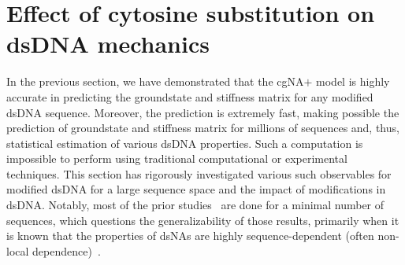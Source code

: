 \section{Effect of cytosine substitution on dsDNA mechanics}\label{c6:comparison_sec}
In the previous section, we have demonstrated that the cgNA$+$ model is highly accurate in predicting the groundstate and stiffness matrix for any modified dsDNA sequence.
Moreover, the prediction is extremely fast, making possible the prediction of groundstate and stiffness matrix for millions of sequences and, thus, statistical estimation of various dsDNA properties.
Such a computation is impossible to perform using traditional computational or experimental techniques. 
This section has rigorously investigated various such observables for modified dsDNA for a large sequence space and the impact of \cpg modifications in dsDNA.
Notably, most of the prior studies~\cite{perez2012impact,battistini2021impact,carvalho2014understanding,b1favour,lefebvre1996solution,rao2018systematic,severin2011cytosine,ngo2016effects,geahigan2000dynamic,jimenez2014unmethylated,severin2013effects} are done for a minimal number of sequences, which questions the generalizability of those results, primarily when it is known that the properties of dsNAs are highly sequence-dependent (often non-local dependence)~\cite{balaceanu2019modulation,beveridge2004molecular,dixit2005molecular,pasi2014muabc,lavery2010systematic}.

